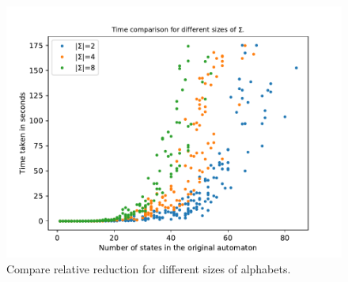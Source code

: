 \begin{figure}
	\centering
	\includegraphics[page=2,height=.3\textheight]{../data/analysis/everything/ap_time_comparison.pdf} 
	\caption{Compare relative reduction for different sizes of alphabets.}
	\label{fig:everything:empirical_compare_reduct}
\end{figure}
